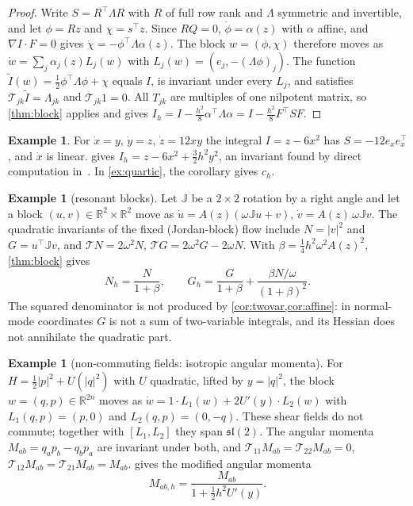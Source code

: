 \documentclass[11pt,a4paper]{article}
\theoremstyle{definition}
\newtheorem{example}[theorem]{Example}
\theoremstyle{remark}
\newcommand{\R}{\mathbb{R}}
\newcommand{\T}{\mathcal{T}}
\newcommand{\Jq}{\mathbb{J}}
\newcommand{\tr}{^{\!\top}}
\begin{document}
\begin{proof}
Write $S=R\tr\Lambda R$ with $R$ of full row rank and $\Lambda$ symmetric and invertible, and let $\phi=Rz$
and $\chi=s\tr z$. Since $RQ=0$, $\dot\phi=\alpha(z)$ with $\alpha$ affine, and $\nabla I\cdot F=0$ gives
$\dot\chi=-\phi\tr\Lambda\alpha(z)$. The block $w=(\phi,\chi)$ therefore moves as
$\dot w=\sum_j\alpha_j(z)L_j(w)$ with $L_j(w)=(e_j,-(\Lambda\phi)_j)$. The function
$\tilde I(w)=\frac12\phi\tr\Lambda\phi+\chi$ equals $I$, is invariant under every $L_j$, and satisfies
$\T_{jk}\tilde I=\Lambda_{jk}$ and $\T_{jk}1=0$. All $T_{jk}$ are multiples of one nilpotent matrix, so
\cref{thm:block} applies and gives $I_h=I-\frac{h^2}8\alpha\tr\Lambda\alpha=I-\frac{h^2}8F\tr SF$.
\end{proof}

\begin{example}\label{ex:ishii}
For $\dot x=y$, $\dot y=z$, $\dot z=12xy$ the integral $I=z-6x^2$ has $S=-12e_xe_x\tr$, and $\dot x$ is
linear.  gives $I_h=z-6x^2+\frac32h^2y^2$, an invariant found by direct computation
in~\cite{CMMOQ14}. In \cref{ex:quartic}, the corollary gives $c_h$.
\end{example}

\begin{example}[resonant blocks]\label{ex:resonant}
Let $\Jq$ be a $2\times2$ rotation by a right angle and let a block $(u,v)\in\R^2\times\R^2$ move as
$\dot u=A(z)(\omega\Jq u+v)$, $\dot v=A(z)\,\omega\Jq v$. The quadratic invariants of the fixed (Jordan-block)
flow include $N=\lvert v\rvert^2$ and $G=u\tr\Jq v$, and $\T N=2\omega^2N$, $\T G=2\omega^2G-2\omega N$. With
$\beta=\frac14h^2\omega^2A(z)^2$, \cref{thm:block} gives
\[
N_h=\frac{N}{1+\beta},\qquad G_h=\frac{G}{1+\beta}+\frac{\beta N/\omega}{(1+\beta)^2}.
\]
The squared denominator is not produced by \cref{cor:twovar,cor:affine}: in normal-mode coordinates $G$ is not
a sum of two-variable integrals, and its Hessian does not annihilate the quadratic part.
\end{example}

\begin{example}[non-commuting fields: isotropic angular momenta]\label{ex:angmom}
For $H=\frac12\lvert p\rvert^2+U(\lvert q\rvert^2)$ with $U$ quadratic, lifted by $y=\lvert q\rvert^2$, the
block $w=(q,p)\in\R^{2n}$ moves as $\dot w=1\cdot L_1(w)+2U'(y)\cdot L_2(w)$ with $L_1(q,p)=(p,0)$ and
$L_2(q,p)=(0,-q)$. These shear fields do not commute; together with $[L_1,L_2]$ they span
$\mathfrak{sl}(2)$. The angular momenta $M_{ab}=q_ap_b-q_bp_a$ are invariant under both, and
$\T_{11}M_{ab}=\T_{22}M_{ab}=0$, $\T_{12}M_{ab}=\T_{21}M_{ab}=M_{ab}$.  gives the modified
angular momenta
\[
M_{ab,h}=\frac{M_{ab}}{1+\frac12h^2U'(y)} .
\]
\end{example}
\end{document}
